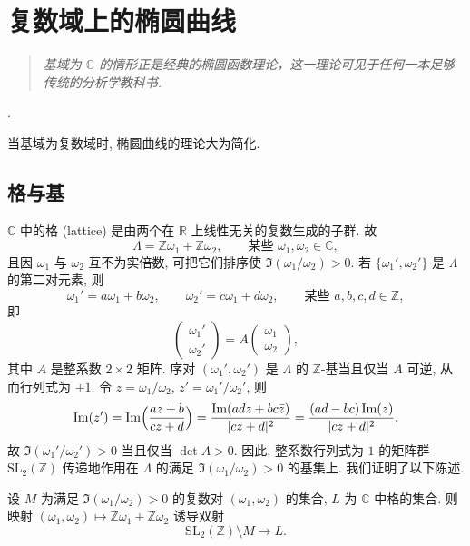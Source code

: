 \chapter{复数域上的椭圆曲线}\label{ch:3}

\begin{quote}\small\itshape
基域为 $\mathbb{C}$ 的情形正是经典的椭圆函数理论，这一理论可见于任何一本足够传统的分析学教科书.
\end{quote}
\vspace{-0.5em}
\hfill \small \cite{cassels1966}.

当基域为复数域时, 椭圆曲线的理论大为简化.

\section{格与基}\label{sec:3.1}

$\mathbb{C}$ 中的格 (lattice) 是由两个在 $\mathbb{R}$ 上线性无关的复数生成的子群. 故
\[
\Lambda = \mathbb{Z}\omega_1 + \mathbb{Z}\omega_2, \qquad \text{某些 } \omega_1, \omega_2\in\mathbb{C},
\]
且因 $\omega_1$ 与 $\omega_2$ 互不为实倍数, 可把它们排序使 $\Im(\omega_1/\omega_2) > 0$. 若 $\{\omega_1', \omega_2'\}$ 是 $\Lambda$ 的第二对元素, 则
\[
\omega_1' = a\omega_1 + b\omega_2, \qquad \omega_2' = c\omega_1 + d\omega_2, \qquad \text{某些 } a, b, c, d\in\mathbb{Z},
\]
即
\[
\begin{pmatrix}\omega_1'\\ \omega_2'\end{pmatrix} = A\begin{pmatrix}\omega_1\\ \omega_2\end{pmatrix},
\]
其中 $A$ 是整系数 $2\times 2$ 矩阵. 序对 $(\omega_1', \omega_2')$ 是 $\Lambda$ 的 $\mathbb{Z}$-基当且仅当 $A$ 可逆, 从而行列式为 $\pm 1$. 令 $z = \omega_1/\omega_2$, $z' = \omega_1'/\omega_2'$, 则
\[
\Im(z') = \Im\Bigl(\frac{az+b}{cz+d}\Bigr) = \frac{\Im(adz + bc\bar{z})}{|cz+d|^2} = \frac{(ad-bc)\Im(z)}{|cz+d|^2},
\]
故 $\Im(\omega_1'/\omega_2') > 0$ 当且仅当 $\det A > 0$. 因此, 整系数行列式为 $1$ 的矩阵群 $\mathrm{SL}_2(\mathbb{Z})$ 传递地作用在 $\Lambda$ 的满足 $\Im(\omega_1/\omega_2) > 0$ 的基集上. 我们证明了以下陈述.

\begin{proposition} \label{thm:3.1.1} 
设 $M$ 为满足 $\Im(\omega_1/\omega_2) > 0$ 的复数对 $(\omega_1, \omega_2)$ 的集合, $L$ 为 $\mathbb{C}$ 中格的集合. 则映射 $(\omega_1, \omega_2)\mapsto\mathbb{Z}\omega_1 + \mathbb{Z}\omega_2$ 诱导双射
\begin{equation} \label{eq:19}
\mathrm{SL}_2(\mathbb{Z})\setminus M \to L.
\tag{19}
\end{equation}
\end{proposition}

